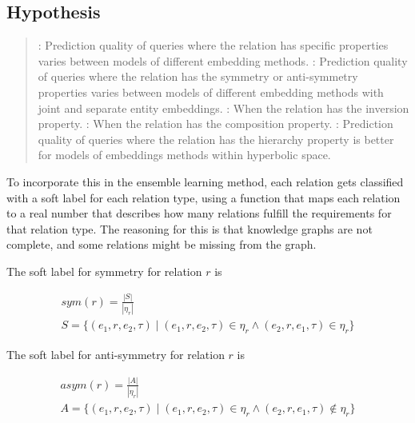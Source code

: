 \addtocounter{hcounter}{1}
\subsection{Hypothesis \thehcounter} %
\label{sec:hypothesis_\thehcounter}

\begin{quote}
:
Prediction quality of queries where the relation has specific properties varies between models of different embedding methods.
\newline{}: Prediction quality of queries where the relation has the symmetry or anti-symmetry properties varies between models of different embedding methods with joint and separate entity embeddings.
\newline{}: When the relation has the inversion property.
\newline{}: When the relation has the composition property.
\newline{}: Prediction quality of queries where the relation has the hierarchy property is better for models of embeddings methods within hyperbolic space.
\end{quote}

To incorporate this in the ensemble learning method, each relation gets classified with a soft label for each relation type, using a function that maps each relation to a real number that describes how many relations fulfill the requirements for that relation type. The reasoning for this is that knowledge graphs are not complete, and some relations might be missing from the graph.

The soft label for symmetry for relation $r$ is

\begin{equation}
\begin{gathered}
\mathit{sym}(r) = \frac{|S|}{|\eta_r|}\\
S = \{ (e_1, r, e_2, \tau) \mid (e_1, r, e_2, \tau) \in \eta_r \wedge (e_2, r, e_1, \tau) \in \eta_r \}
\end{gathered}
\end{equation}

\noindent
The soft label for anti-symmetry for relation $r$ is

\begin{equation}
\begin{gathered}
\mathit{asym}(r) = \frac{|A|}{|\eta_r|}\\
A = \{ (e_1, r, e_2, \tau) \mid (e_1, r, e_2, \tau) \in \eta_r \wedge (e_2, r, e_1, \tau) \notin \eta_r \}
\end{gathered}
\end{equation}

